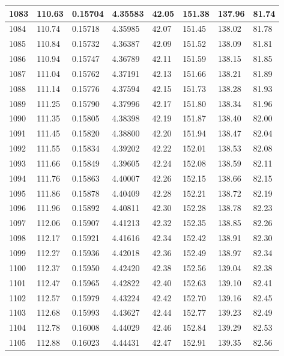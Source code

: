 \documentclass[12pt,a4paper,twoside]{article}
\begin{document}
\begin{center}
\begin{longtable}{l l l l | l l l l}
1083 & 110.63 & 0.15704 & 4.35583 & 42.05 & 151.38 & 137.96 & 81.74 \\ \hline
1084 & 110.74 & 0.15718 & 4.35985 & 42.07 & 151.45 & 138.02 & 81.78 \\ \hline
1085 & 110.84 & 0.15732 & 4.36387 & 42.09 & 151.52 & 138.09 & 81.81 \\ \hline
1086 & 110.94 & 0.15747 & 4.36789 & 42.11 & 151.59 & 138.15 & 81.85 \\ \hline
1087 & 111.04 & 0.15762 & 4.37191 & 42.13 & 151.66 & 138.21 & 81.89 \\ \hline
1088 & 111.14 & 0.15776 & 4.37594 & 42.15 & 151.73 & 138.28 & 81.93 \\ \hline
1089 & 111.25 & 0.15790 & 4.37996 & 42.17 & 151.80 & 138.34 & 81.96 \\ \hline
1090 & 111.35 & 0.15805 & 4.38398 & 42.19 & 151.87 & 138.40 & 82.00 \\ \hline
1091 & 111.45 & 0.15820 & 4.38800 & 42.20 & 151.94 & 138.47 & 82.04 \\ \hline
1092 & 111.55 & 0.15834 & 4.39202 & 42.22 & 152.01 & 138.53 & 82.08 \\ \hline
1093 & 111.66 & 0.15849 & 4.39605 & 42.24 & 152.08 & 138.59 & 82.11 \\ \hline
1094 & 111.76 & 0.15863 & 4.40007 & 42.26 & 152.15 & 138.66 & 82.15 \\ \hline
1095 & 111.86 & 0.15878 & 4.40409 & 42.28 & 152.21 & 138.72 & 82.19 \\ \hline
1096 & 111.96 & 0.15892 & 4.40811 & 42.30 & 152.28 & 138.78 & 82.23 \\ \hline
1097 & 112.06 & 0.15907 & 4.41213 & 42.32 & 152.35 & 138.85 & 82.26 \\ \hline
1098 & 112.17 & 0.15921 & 4.41616 & 42.34 & 152.42 & 138.91 & 82.30 \\ \hline
1099 & 112.27 & 0.15936 & 4.42018 & 42.36 & 152.49 & 138.97 & 82.34 \\ \hline
1100 & 112.37 & 0.15950 & 4.42420 & 42.38 & 152.56 & 139.04 & 82.38 \\ \hline
1101 & 112.47 & 0.15965 & 4.42822 & 42.40 & 152.63 & 139.10 & 82.41 \\ \hline
1102 & 112.57 & 0.15979 & 4.43224 & 42.42 & 152.70 & 139.16 & 82.45 \\ \hline
1103 & 112.68 & 0.15993 & 4.43627 & 42.44 & 152.77 & 139.23 & 82.49 \\ \hline
1104 & 112.78 & 0.16008 & 4.44029 & 42.46 & 152.84 & 139.29 & 82.53 \\ \hline
1105 & 112.88 & 0.16023 & 4.44431 & 42.47 & 152.91 & 139.35 & 82.56 \\ \hline

\end{longtable}
\end{center}
\end{document}

